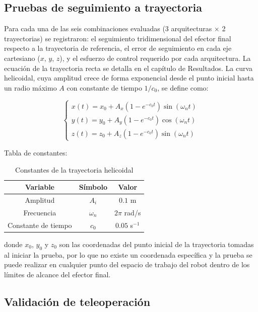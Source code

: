 \subsection{Pruebas de seguimiento a trayectoria}

Para cada una de las seis combinaciones evaluadas (3 arquitecturas \(\times\) 2
trayectorias) se registraron: el seguimiento tridimensional del efector final
respecto a la trayectoria de referencia, el error de seguimiento en cada eje
cartesiano (\(x\), \(y\), \(z\)), y el esfuerzo de control requerido por cada
arquitectura. La ecuación de la trayectoria recta se detalla en el capítulo de
Resultados. La curva helicoidal, cuya amplitud crece de forma exponencial
desde el punto inicial hasta un radio máximo \(A\) con constante de tiempo
\(1/c_0\), se define como:

\begin{equation}[H]
	\begin{cases}
		x(t) = x_0 + A_x\left(1-e^{-c_0 t}\right)\sin(\omega_n t) \\
		y(t) = y_0 + A_y\left(1-e^{-c_0 t}\right)\cos(\omega_n t) \\
		z(t) = z_0 + A_z\left(1-e^{-c_0 t}\right)\sin(\omega_n t)
	\end{cases}
\end{equation}

Tabla de constantes:

\begin{table}[H]
	\centering
	\begin{tabular}{| c | c | c |}
		\hline
		Variable            & Símbolo      & Valor               \\
		\hline
		Amplitud            & \(A_i\)      & \(0.1\) m           \\
		\hline
		Frecuencia          & \(\omega_n\) & \(2\pi\) rad/s      \\
		\hline
		Constante de tiempo & \(c_0\)      & \(0.05\) s\(^{-1}\) \\
		\hline
	\end{tabular}
	\caption{Constantes de la trayectoria helicoidal}
	\label{tab:constantes_trayectoria_helicoidal}
\end{table}

donde \(x_0\), \(y_0\) y \(z_0\) son las coordenadas del punto inicial de la
trayectoria tomadas
al iniciar la prueba, por lo que no existe un coordenada específica y la prueba
se puede
realizar en cualquier punto del espacio de trabajo del robot dentro de los
límites de alcance del efector final.
\subsection{Validación de teleoperación}

